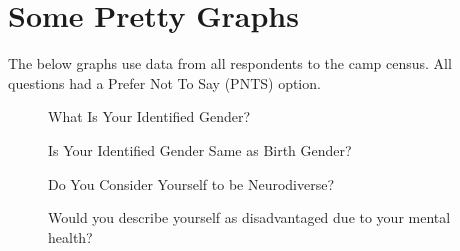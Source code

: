 \section{Some Pretty Graphs}
The below graphs use data from all respondents to the camp census. All questions had a Prefer Not To Say (PNTS) option. 
\begin{figure}[H]
    \begin{minipage}{0.4\textwidth}
        \centering
        \caption{What Is Your Identified Gender?}
    \end{minipage}\hfill
    \begin{minipage}{0.4\textwidth}
        \centering
        \caption{Is Your Identified Gender Same as Birth Gender?}
    \end{minipage}\hfill
\end{figure}

\begin{figure}[H]
    \begin{minipage}{0.4\textwidth}
        \centering
        \caption{Do You Consider Yourself to be Neurodiverse?}
    \end{minipage}\hfill
    \begin{minipage}{0.4\textwidth}
        \centering
        \caption{Would you describe yourself as disadvantaged due to your mental health?}
    \end{minipage}\hfill
\end{figure}